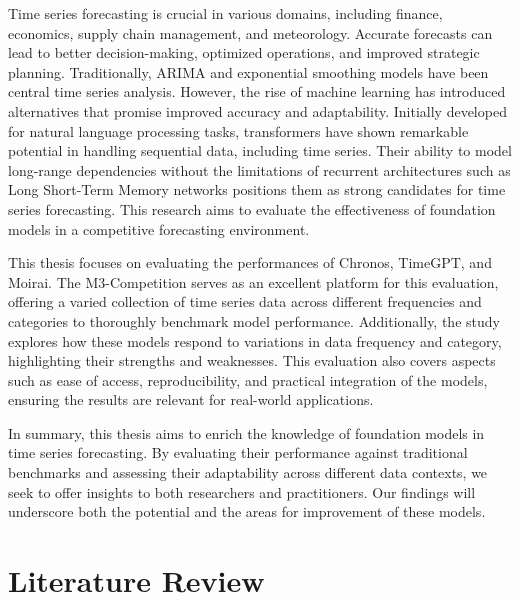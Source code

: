 \documentclass[12pt,a4paper]{article}
\begin{document}
Time series forecasting is crucial in various domains, including finance, economics, supply chain management, and meteorology. Accurate forecasts can lead to better decision-making, optimized operations, and improved strategic planning. Traditionally, ARIMA and exponential smoothing models have been central time series analysis. However, the rise of machine learning has introduced alternatives that promise improved accuracy and adaptability. Initially developed for natural language processing tasks, transformers have shown remarkable potential in handling sequential data, including time series. Their ability to model long-range dependencies without the limitations of recurrent architectures such as Long Short-Term Memory networks positions them as strong candidates for time series forecasting. This research aims to evaluate the effectiveness of foundation models in a competitive forecasting environment.

This thesis focuses on evaluating the performances of Chronos, TimeGPT, and Moirai. The M3-Competition serves as an excellent platform for this evaluation, offering a varied collection of time series data across different frequencies and categories to thoroughly benchmark model performance. Additionally, the study explores how these models respond to variations in data frequency and category, highlighting their strengths and weaknesses. This evaluation also covers aspects such as ease of access, reproducibility, and practical integration of the models, ensuring the results are relevant for real-world applications.

In summary, this thesis aims to enrich the knowledge of foundation models in time series forecasting. By evaluating their performance against traditional benchmarks and assessing their adaptability across different data contexts, we seek to offer insights to both researchers and practitioners. Our findings will underscore both the potential and the areas for improvement of these models.


\newpage
{\centering \section{Literature Review} \par}
\end{document}
